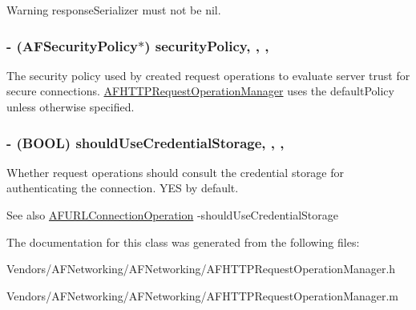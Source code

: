 \begin{DoxyWarning}{Warning}
{\ttfamily response\+Serializer} must not be {\ttfamily nil}. 
\end{DoxyWarning}
\hypertarget{interface_a_f_h_t_t_p_request_operation_manager_a96785228e50486dbc2d3f236cb87f945}{}
\subsubsection[{security\+Policy}]{\setlength{\rightskip}{0pt plus 5cm}-\/ ({\bf A\+F\+Security\+Policy}$\ast$) security\+Policy\hspace{0.3cm}{\ttfamily [read]}, {\ttfamily [write]}, {\ttfamily [nonatomic]}, {\ttfamily [strong]}}\label{interface_a_f_h_t_t_p_request_operation_manager_a96785228e50486dbc2d3f236cb87f945}
The security policy used by created request operations to evaluate server trust for secure connections. {\ttfamily \hyperlink{interface_a_f_h_t_t_p_request_operation_manager}{A\+F\+H\+T\+T\+P\+Request\+Operation\+Manager}} uses the {\ttfamily default\+Policy} unless otherwise specified. \hypertarget{interface_a_f_h_t_t_p_request_operation_manager_a9a9619e8520c1842a7aedec71002b81c}{}
\subsubsection[{should\+Use\+Credential\+Storage}]{\setlength{\rightskip}{0pt plus 5cm}-\/ (B\+O\+O\+L) should\+Use\+Credential\+Storage\hspace{0.3cm}{\ttfamily [read]}, {\ttfamily [write]}, {\ttfamily [nonatomic]}, {\ttfamily [assign]}}\label{interface_a_f_h_t_t_p_request_operation_manager_a9a9619e8520c1842a7aedec71002b81c}
Whether request operations should consult the credential storage for authenticating the connection. {\ttfamily Y\+E\+S} by default.

\begin{DoxySeeAlso}{See also}
\hyperlink{interface_a_f_u_r_l_connection_operation}{A\+F\+U\+R\+L\+Connection\+Operation} -\/should\+Use\+Credential\+Storage 
\end{DoxySeeAlso}


The documentation for this class was generated from the following files\+:\begin{DoxyCompactItemize}
\item 
Vendors/\+A\+F\+Networking/\+A\+F\+Networking/A\+F\+H\+T\+T\+P\+Request\+Operation\+Manager.\+h\item 
Vendors/\+A\+F\+Networking/\+A\+F\+Networking/A\+F\+H\+T\+T\+P\+Request\+Operation\+Manager.\+m\end{DoxyCompactItemize}
